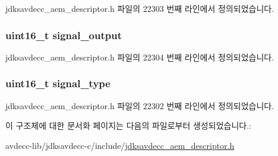 jdksavdecc\+\_\+aem\+\_\+descriptor.\+h 파일의 22303 번째 라인에서 정의되었습니다.

\subsubsection[{\texorpdfstring{signal\+\_\+output}{signal_output}}]{\setlength{\rightskip}{0pt plus 5cm}uint16\+\_\+t signal\+\_\+output}\hypertarget{structjdksavdecc__descriptor__signal__demultiplexer_ab4b91864e6fc335d7e86536d9f4461e4}{}\label{structjdksavdecc__descriptor__signal__demultiplexer_ab4b91864e6fc335d7e86536d9f4461e4}


jdksavdecc\+\_\+aem\+\_\+descriptor.\+h 파일의 22304 번째 라인에서 정의되었습니다.

\subsubsection[{\texorpdfstring{signal\+\_\+type}{signal_type}}]{\setlength{\rightskip}{0pt plus 5cm}uint16\+\_\+t signal\+\_\+type}\hypertarget{structjdksavdecc__descriptor__signal__demultiplexer_a248e60ef99d5ed1779989d1dd6b6dc5a}{}\label{structjdksavdecc__descriptor__signal__demultiplexer_a248e60ef99d5ed1779989d1dd6b6dc5a}


jdksavdecc\+\_\+aem\+\_\+descriptor.\+h 파일의 22302 번째 라인에서 정의되었습니다.



이 구조체에 대한 문서화 페이지는 다음의 파일로부터 생성되었습니다.\+:\begin{DoxyCompactItemize}
\item 
avdecc-\/lib/jdksavdecc-\/c/include/\hyperlink{jdksavdecc__aem__descriptor_8h}{jdksavdecc\+\_\+aem\+\_\+descriptor.\+h}\end{DoxyCompactItemize}
